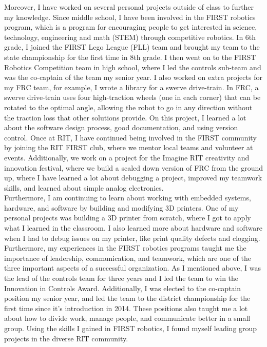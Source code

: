 \documentclass[line,margin]{res}
\begin{document}
\begin{resume}
\begin{adjustwidth}{-92pt}{0pt}
\noindent
Moreover, I have worked on several personal projects outside of class to further my knowledge. Since middle school, I have been involved in the FIRST robotics program, which is a program for encouraging people to get interested in science, technology, engineering and math (STEM) through competitive robotics. In 6th grade, I joined the FIRST Lego League (FLL) team and brought my team to the state championship for the first time in 8th grade. I then went on to the FIRST Robotics Competition team in high school, where I led the controls sub-team and was the co-captain of the team my senior year. I also worked on extra projects for my FRC team, for example, I wrote a library for a swerve drive-train. In FRC, a swerve drive-train uses four high-traction wheels (one in each corner) that can be rotated to the optimal angle, allowing the robot to go in any direction without the traction loss that other solutions provide. On this project, I learned a lot about the software design process, good documentation, and using version control. Once at RIT, I have continued being involved in the FIRST community by joining the RIT FIRST club, where we mentor local teams and volunteer at events. Additionally, we work on a project for the Imagine RIT creativity and innovation festival, where we build a scaled down version of FRC from the ground up, where I have learned a lot about debugging a project, improved my teamwork skills, and learned about simple analog electronics. \\

\noindent
Furthermore, I am continuing to learn about working with embedded systems, hardware, and software by building and modifying 3D printers. One of my personal projects was building a 3D printer from scratch, where I got to apply what I learned in the classroom. I also learned more about hardware and software when I had to debug issues on my printer, like print quality defects and clogging. \\

\noindent
Furthermore, my experiences in the FIRST robotics programs taught me the importance of leadership, communication, and teamwork, which are one of the three important aspects of a successful organization. As I mentioned above, I was the lead of the controls team for three years and I led the team to win the Innovation in Controls Award. Additionally, I was elected to the co-captain position my senior year, and led the team to the district championship for the first time since it's introduction in 2014. These positions also taught me a lot about how to divide work, manage people, and communicate better in a small group. Using the skills I gained in FIRST robotics, I found myself leading group projects in the diverse RIT community. \\


\end{adjustwidth}
\end{resume}
\end{document}
